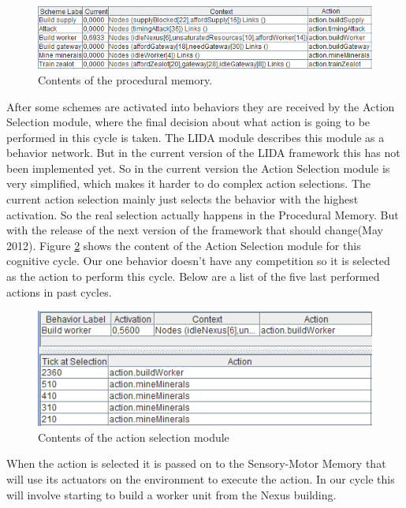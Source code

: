 \begin{figure}[h!tb]
\centering
\includegraphics[width=\textwidth]{graphics/procedural_memory.png}
\caption{Contents of the procedural memory.}
\label{fig:proceduralmemory}
\end{figure}

After some schemes are activated into behaviors they are received by the Action Selection module, where the final decision about what action is going to be performed in this cycle is taken. The LIDA module describes this module as a behavior network\cite{maes1989right}. But in the current version of the LIDA framework this has not been implemented yet. So in the current version the Action Selection module is very simplified, which makes it harder to do complex action selections. The current action selection mainly just selects the behavior with the highest activation. So the real selection actually happens in the Procedural Memory. But with the release of the next version of the framework that should change(May 2012). Figure \ref{fig:actionselection} shows the content of the Action Selection module for this cognitive cycle. Our one behavior doesn't have any competition so it is selected as the action to perform this cycle. Below are a list of the five last performed actions in past cycles.

\begin{figure}[h!tb]
\centering
\includegraphics[scale=1.0]{graphics/action_selection.png}
\caption{Contents of the action selection module}
\label{fig:actionselection}
\end{figure}

When the action is selected it is passed on to the Sensory-Motor Memory that will use its actuators on the environment to execute the action. In our cycle this will involve starting to build a worker unit from the Nexus building.
